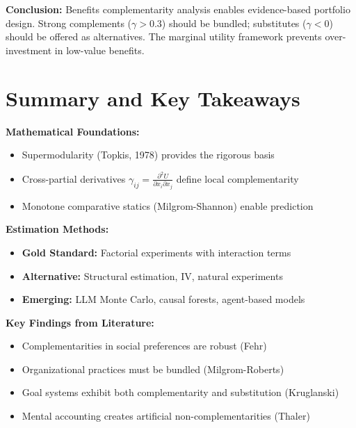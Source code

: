 \textbf{Conclusion:} Benefits complementarity analysis enables evidence-based portfolio design. Strong complements ($\gamma > 0.3$) should be bundled; substitutes ($\gamma < 0$) should be offered as alternatives. The marginal utility framework prevents over-investment in low-value benefits.


\section{Summary and Key Takeaways}
\label{sec:summary}

\begin{tcolorbox}[colback=gray!5!white,colframe=gray!75!black,title=\textbf{Summary: Complementarity Measurement Methodology}]

\textbf{Mathematical Foundations:}
\begin{itemize}[noitemsep]
    \item Supermodularity (Topkis, 1978) provides the rigorous basis
    \item Cross-partial derivatives $\gamma_{ij} = \frac{\partial^2 U}{\partial x_i \partial x_j}$ define local complementarity
    \item Monotone comparative statics (Milgrom-Shannon) enable prediction
\end{itemize}

\textbf{Estimation Methods:}
\begin{itemize}[noitemsep]
    \item \textbf{Gold Standard:} Factorial experiments with interaction terms
    \item \textbf{Alternative:} Structural estimation, IV, natural experiments
    \item \textbf{Emerging:} LLM Monte Carlo, causal forests, agent-based models
\end{itemize}

\textbf{Key Findings from Literature:}
\begin{itemize}[noitemsep]
    \item Complementarities in social preferences are robust (Fehr)
    \item Organizational practices must be bundled (Milgrom-Roberts)
    \item Goal systems exhibit both complementarity and substitution (Kruglanski)
    \item Mental accounting creates artificial non-complementarities (Thaler)
\end{itemize}


\end{tcolorbox}
